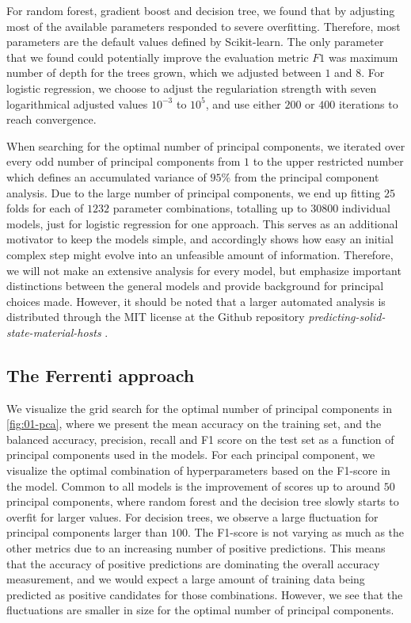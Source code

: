 For random forest, gradient boost and decision tree, we found that by adjusting most of the available parameters responded to severe overfitting. Therefore, most parameters are the default values defined by Scikit-learn. The only parameter that we found could potentially improve the evaluation metric $F1$ was maximum number of depth for the trees grown, which we adjusted between $1$ and $8$. For logistic regression, we choose to adjust the regulariation strength with seven logarithmical adjusted values $10^{-3}$ to $10^{5}$, and use either $200$ or $400$ iterations to reach convergence.

When searching for the optimal number of principal components, we iterated over every odd number of principal components from $1$ to the upper restricted number which defines an accumulated variance of $95\%$ from the principal component analysis. Due to the large number of principal components, we end up fitting $25$ folds for each of $1232$ parameter combinations, totalling up to $30800$ individual models, just for logistic regression for one approach. This serves as an additional motivator to keep the models simple, and accordingly shows how easy an initial complex step might evolve into an unfeasible amount of information. Therefore, we will not make an extensive analysis for every model, but emphasize important distinctions between the general models and provide background for principal choices made. However, it should be noted that a larger automated analysis is distributed through the MIT license at the Github repository \textit{predicting-solid-state-material-hosts} \cite{Ohebbi2021}.


\subsection{The Ferrenti approach}

We visualize the grid search for the optimal number of principal components in \autoref{fig:01-pca}, where we present the mean accuracy on the training set, and the balanced accuracy, precision, recall and F1 score on the test set as a function of principal components used in the models. For each principal component, we visualize the optimal combination of hyperparameters based on the F1-score in the model. Common to all models is the improvement of scores up to around $50$ principal components, where random forest and the decision tree slowly starts to overfit for larger values. For decision trees, we observe a large fluctuation for principal components larger than $100$. The F1-score is not varying as much as the other metrics due to an increasing number of positive predictions. This means that the accuracy of positive predictions are dominating the overall accuracy measurement, and we would expect a large amount of training data being predicted as positive candidates for those combinations. However, we see that the fluctuations are smaller in size for the optimal number of principal components.

